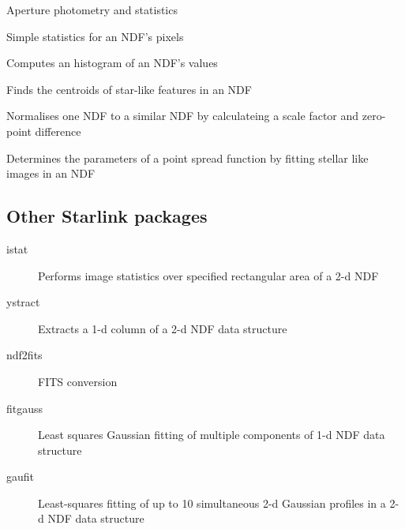 \documentclass[twoside,11pt]{article}
\newcommand{\Figaro}{\xref{\textsc{Figaro}}{sun86}{}}
\newcommand{\convert}{\xref{\textsc{Convert}}{sun55}{}}
\newcommand{\Specdre}{\xref{\textsc{Specdre}}{sun140}{}}
\newcommand{\ESP}{\xref{ESP}{sun180}{}}
\newcommand{\task}[1]{\textsf{#1}}
\newcommand{\aperadd}{\xref{\task{aperadd}}{sun95}{APERADD}}
\newcommand{\centroid}{\xref{\task{centroid}}{sun95}{CENTROID}}
\newcommand{\stats}{\xref{\task{stats}}{sun95}{STATS}}
\newcommand{\psf}{\xref{\task{psf}}{sun95}{PSF}}
\newcommand{\histogram}{\xref{\task{histogram}}{sun95}{HISTOGRAM}}
\newcommand{\normalize}{\xref{\task{normalize}}{sun95}{NORMALIZE}}
\newcommand{\ndffits}{\xref{\task{ndf2fits}}{sun55}{NDF2FITS}}
\newcommand{\istat}{\xref{\task{istat}}{sun86}{ISTAT}}
\newcommand{\ystract}{\xref{\task{ystract}}{sun86}{YSTRACT}}
\newcommand{\fitgauss}{\xref{\task{fitgauss}}{sun140}{FITGAUSS}}
\newcommand{\gaufit}{\xref{\task{gaufit}}{sun180}{GAUFIT}}
\newcommand{\xref}[3]{#1}
\newcommand{\xlabel}[1]{}
\begin{document}
{\begin{description}
\setlength{\itemsep}{-5pt}

\item[\aperadd] Aperture photometry and statistics
\item[\stats] Simple statistics for an NDF's pixels
\item[\histogram] Computes an histogram of an NDF's values
\item[\centroid] Finds the centroids of star-like features in an NDF
\item[\normalize] Normalises one NDF to a similar NDF by calculateing a scale factor and zero-point difference
\item[\psf] Determines the parameters of a point spread function by fitting stellar like images in an NDF
\end{description}

\subsection{\xlabel{other_starlink_packages}Other Starlink packages}

\begin{description}
\setlength{\itemsep}{-5pt}
\item[\Figaro] \mbox{}
\begin{description}
\item[\istat] Performs image statistics over specified rectangular area of a
2-d NDF
\item[\ystract] Extracts a 1-d column of a 2-d NDF data structure
\end{description}

\item[\convert] \mbox{}
\begin{description}
\item[\ndffits] FITS conversion
\end{description}

\item[\Specdre] \mbox{}
\begin{description}
\item[\fitgauss] Least squares Gaussian fitting of multiple components of 1-d
NDF data structure
\end{description}

\item[\ESP \cite{esp}] \mbox{}
\begin{description}
\item[\gaufit] Least-squares fitting of up to 10 simultaneous 2-d Gaussian
profiles in a 2-d NDF data structure
\end{description}


\end{description}}
\end{document}
